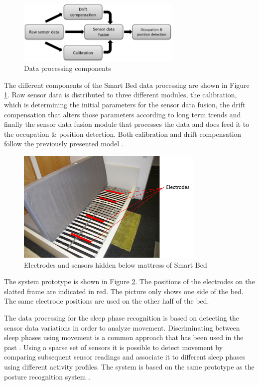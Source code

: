 \begin{figure}[ht]
\centering
\includegraphics[width=0.7\textwidth]{images/smartbed_proc}
\caption{Data processing components \cite{braun2012context}}
\label{fig:smartbed_proc}
\end{figure}

The different components of the Smart Bed data processing are shown in Figure \ref{fig:smartbed_proc}. Raw sensor data is distributed to three different modules, the calibration, which is determining the initial parameters for the sensor data fusion, the drift compensation that alters those parameters according to long term trends and finally the sensor data fusion module that processes the data and does feed it to the occupation \& position detection. Both calibration and drift compensation follow the previously presented model \cite{braun2012context}. 

\begin{figure}[ht]
\centering
\includegraphics[width=0.8\textwidth]{images/disc_unob_bed}
\caption{Electrodes and sensors hidden below mattress of Smart Bed \cite{braun2012context}}
\label{fig:disc_unob_bed}
\end{figure}

The system prototype is shown in Figure \ref{fig:disc_unob_bed}. The positions of the electrodes on the slatted frame are indicated in red. The picture only shows one side of the bed. The same electrode positions are used on the other half of the bed.

The data processing for the sleep phase recognition is based on detecting the sensor data variations in order to analyze movement. Discriminating between sleep phases using movement is a common approach that has been used in the past \cite{salmi86}. Using a sparse set of sensors it is possible to detect movement by comparing subsequent sensor readings and associate it to different sleep phases using different activity profiles. The system is based on the same prototype as the posture recognition system \cite{Djakow2013movibed}.
 

